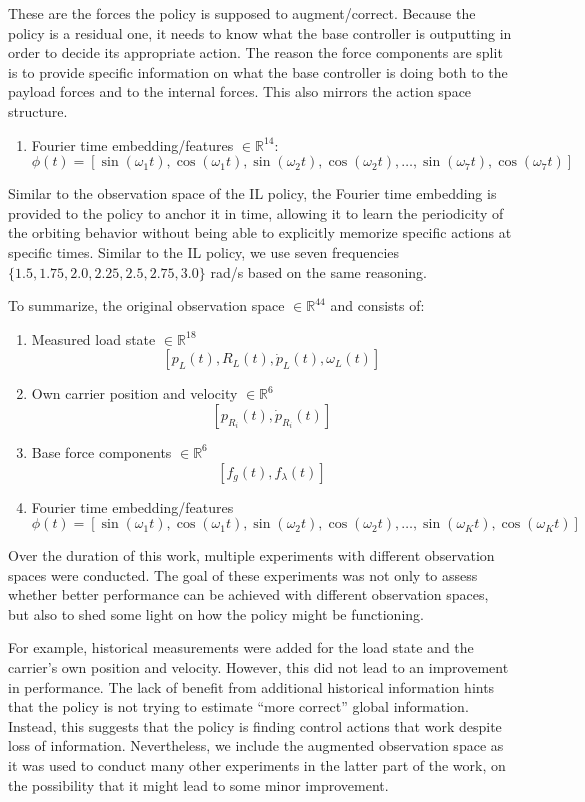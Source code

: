 These are the forces the policy is supposed to augment/correct. Because
the policy is a residual one, it needs to know what the base
controller is outputting in order to decide its appropriate action. The
reason the force components are split is to provide specific
information on what the base controller is doing both to the payload
forces and to the internal forces. This also mirrors the action space
structure.

\begin{enumerate}[resume]
  \item Fourier time embedding/features $\in \mathbb{R}^{14}$:
  \[
    \phi(t) = [\sin(\omega_1 t), \cos(\omega_1 t), \sin(\omega_2 t), \cos(\omega_2 t), \dots, \sin(\omega_7 t), \cos(\omega_7 t)]
  \]
\end{enumerate}

Similar to the observation space of the IL policy, the Fourier time
embedding is   provided to the policy to anchor it in time, allowing it
to learn the periodicity of the orbiting behavior without being able to
explicitly memorize specific actions at specific times. Similar to the
IL policy, we use seven frequencies $\{1.5, 1.75, 2.0, 2.25, 2.5, 2.75,
3.0\}$ rad/s based on the same reasoning.

To summarize, the original observation space $\in \mathbb{R}^{44}$ and
consists of:

\begin{enumerate}
  \item Measured load state $\in \mathbb{R}^{18}$
  \[
    [p_L(t), R_L(t), \dot{p}_L(t), \omega_L(t)]
  \]
  \item Own carrier position and velocity $\in \mathbb{R}^6$
  \[
    [p_{R_i}(t), \dot{p}_{R_i}(t)]
  \]
  \item Base force components $\in \mathbb{R}^6$
  \[
    [f_g(t), f_\lambda(t)]
  \]
  \item Fourier time embedding/features
  \[
    \phi(t) = [\sin(\omega_1 t), \cos(\omega_1 t), \sin(\omega_2 t), \cos(\omega_2 t), \dots, \sin(\omega_K t), \cos(\omega_K t)]
  \]
\end{enumerate}

Over the duration of this work, multiple experiments with different
observation spaces were conducted. The goal of these experiments was
not only to assess whether better performance can be achieved with
different observation spaces, but also to shed some light on how the
policy might be functioning.

For example, historical measurements were added for the load state and
the carrier’s own position and velocity. However, this did not lead to
an improvement in performance. The lack of benefit from additional
historical information hints that the policy is not trying to estimate
“more correct” global information. Instead, this suggests that the
policy is finding control actions that work despite loss of
information. Nevertheless, we include the augmented observation space
as it was used to conduct many other experiments in the latter part of
the work, on the possibility that it might lead to some minor
improvement.

